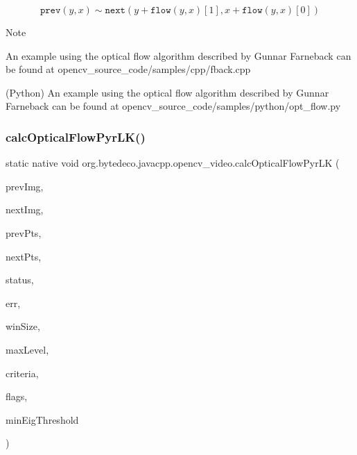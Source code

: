 \[\texttt{prev} (y,x) \sim \texttt{next} ( y + \texttt{flow} (y,x)[1], x + \texttt{flow} (y,x)[0])\] 

\begin{DoxyNote}{Note}

\end{DoxyNote}

\begin{DoxyItemize}
\item An example using the optical flow algorithm described by Gunnar Farneback can be found at opencv\+\_\+source\+\_\+code/samples/cpp/fback.\+cpp
\item (Python) An example using the optical flow algorithm described by Gunnar Farneback can be found at opencv\+\_\+source\+\_\+code/samples/python/opt\+\_\+flow.\+py 
\end{DoxyItemize}\mbox{\label{group__video__track_ga5336cf64b4b2f82bf7c08551017fda66}} 
\subsubsection{\texorpdfstring{calc\+Optical\+Flow\+Pyr\+L\+K()}{calcOpticalFlowPyrLK()}}
{\footnotesize\ttfamily static native void org.\+bytedeco.\+javacpp.\+opencv\+\_\+video.\+calc\+Optical\+Flow\+Pyr\+LK (\begin{DoxyParamCaption}\item[{@By\+Val Mat}]{prev\+Img,  }\item[{@By\+Val Mat}]{next\+Img,  }\item[{@By\+Val Mat}]{prev\+Pts,  }\item[{@By\+Val Mat}]{next\+Pts,  }\item[{@By\+Val Mat}]{status,  }\item[{@By\+Val Mat}]{err,  }\item[{@By\+Val(null\+Value=\char`\"{}cv\+::\+Size(21,21)\char`\"{}) Size}]{win\+Size,  }\item[{int}]{max\+Level,  }\item[{@By\+Val(null\+Value=\char`\"{}cv\+::\+Term\+Criteria(cv\+::\+Term\+Criteria\+::\+C\+O\+U\+NT+cv\+::\+Term\+Criteria\+::\+E\+PS, 30, 0.\+01)\char`\"{}) Term\+Criteria}]{criteria,  }\item[{int}]{flags,  }\item[{double}]{min\+Eig\+Threshold }\end{DoxyParamCaption})\hspace{0.3cm}{\ttfamily [static]}}



